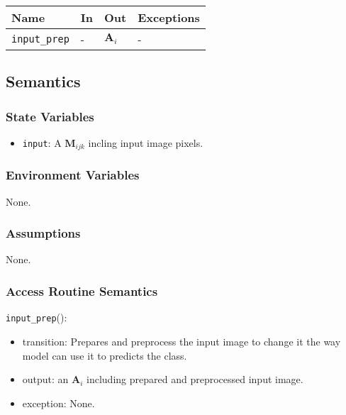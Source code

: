 \documentclass[12pt, titlepage]{article}
\def\code#1{\texttt{#1}}
\begin{document}
\begin{center}
\begin{tabular}{p{3.5cm} p{4cm} p{4cm} p{2cm}}
\hline
\textbf{Name} & \textbf{In} & \textbf{Out} & \textbf{Exceptions} \\
\hline
\code{input\_prep} & - & $\mathbf{A}_{i}$ & - \\
\hline
\end{tabular}
\end{center}

\subsection{Semantics}

\subsubsection{State Variables}
\begin{itemize}
  \item \code{input}: A $\mathbf{M}_{ijk}$ incling input image pixels.
\end{itemize}

\subsubsection{Environment Variables}
None.

\subsubsection{Assumptions}
None.

\subsubsection{Access Routine Semantics}

\noindent \code{input\_prep}():
\begin{itemize}
  \item transition: Prepares and preprocess the input image to change it 
  the way model can use it to predicts the class.
  \item output: an $\mathbf{A}_{i}$ including prepared and preprocessed input image.
  \item exception: None.
\end{itemize}
\end{document}
